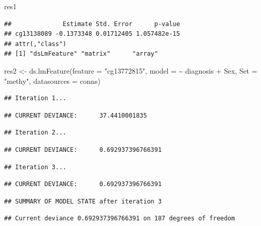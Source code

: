\documentclass[
]{book}
\newenvironment{Shaded}{\begin{snugshade}}{\end{snugshade}}
\newcommand{\AttributeTok}[1]{\textcolor[rgb]{0.77,0.63,0.00}{#1}}
\newcommand{\FunctionTok}[1]{\textcolor[rgb]{0.00,0.00,0.00}{#1}}
\newcommand{\NormalTok}[1]{#1}
\newcommand{\OtherTok}[1]{\textcolor[rgb]{0.56,0.35,0.01}{#1}}
\newcommand{\SpecialCharTok}[1]{\textcolor[rgb]{0.00,0.00,0.00}{#1}}
\newcommand{\StringTok}[1]{\textcolor[rgb]{0.31,0.60,0.02}{#1}}
\begin{document}
\begin{Shaded}
\begin{Highlighting}[]
\NormalTok{res1}
\end{Highlighting}
\end{Shaded}

\begin{verbatim}
##              Estimate Std. Error      p-value
## cg13138089 -0.1373348 0.01712405 1.057482e-15
## attr(,"class")
## [1] "dsLmFeature" "matrix"      "array"
\end{verbatim}

\begin{Shaded}
\begin{Highlighting}[]
\NormalTok{res2 }\OtherTok{\textless{}{-}} \FunctionTok{ds.lmFeature}\NormalTok{(}\AttributeTok{feature =} \StringTok{"cg13772815"}\NormalTok{, }
                     \AttributeTok{model =} \SpecialCharTok{\textasciitilde{}}\NormalTok{ diagnosis }\SpecialCharTok{+}\NormalTok{ Sex, }
                     \AttributeTok{Set =} \StringTok{"methy"}\NormalTok{,}
                     \AttributeTok{datasources =}\NormalTok{ conns)}
\end{Highlighting}
\end{Shaded}

\begin{verbatim}
## Iteration 1...
\end{verbatim}

\begin{verbatim}
## CURRENT DEVIANCE:      37.4410001835
\end{verbatim}

\begin{verbatim}
## Iteration 2...
\end{verbatim}

\begin{verbatim}
## CURRENT DEVIANCE:      0.692937396766391
\end{verbatim}

\begin{verbatim}
## Iteration 3...
\end{verbatim}

\begin{verbatim}
## CURRENT DEVIANCE:      0.692937396766391
\end{verbatim}

\begin{verbatim}
## SUMMARY OF MODEL STATE after iteration 3
\end{verbatim}

\begin{verbatim}
## Current deviance 0.692937396766391 on 187 degrees of freedom
\end{verbatim}
\end{document}
